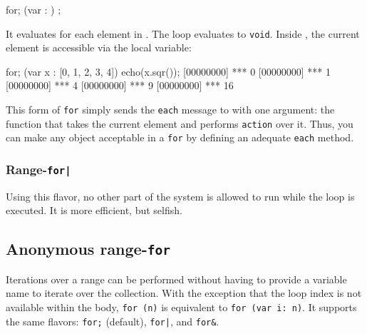 \begin{urbiunchecked}
for; (var  : )
   ;
\end{urbiunchecked}

It evaluates  for each element in . The loop
evaluates to \lstinline{void}.  Inside , the current element is
accessible via the  local variable:

\begin{urbiscript}
for; (var x : [0, 1, 2, 3, 4])
  echo(x.sqr());
[00000000] *** 0
[00000000] *** 1
[00000000] *** 4
[00000000] *** 9
[00000000] *** 16
\end{urbiscript}

This form of \lstinline{for} simply sends the \lstinline{each} message to
 with one argument: the function that takes the current
element and performs \lstinline{action} over it. Thus, you can make any
object acceptable in a \lstinline{for} by defining an adequate
\lstinline{each} method.


\subsubsection{Range-\lstinline{for|}}
\label{sec:lang:foreach:pipe}

Using this flavor, no other part of the system is allowed to run while the
loop is executed.  It is more efficient, but selfish.

\subsection{Anonymous range-\lstinline{for}}
\label{sec:lang:forn}

Iterations over a range can be performed without having to provide a
variable name to iterate over the collection.  With the exception that the
loop index is not available within the body, \lstinline|for (n)| is
equivalent to \lstinline|for (var i: n)|.  It supports the same flavors:
\lstinline|for;| (default), \lstinline{for|}, and \lstinline|for&|.

